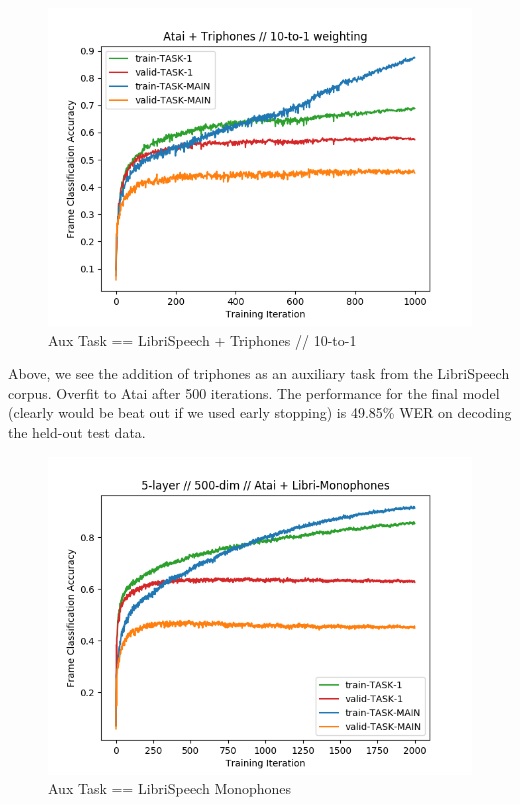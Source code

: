 \documentclass[a4paper]{article}
\begin{document}
\begin{figure}[!htb]
  \centering
{}
  \includegraphics[width=\linewidth]{figs/atai-libritriphones-10-to-1.png}
  \caption{Aux Task == LibriSpeech + Triphones // 10-to-1}
\endminipage\hfill
\end{figure}



Above, we see the addition of triphones as an auxiliary task from the LibriSpeech corpus. Overfit to Atai after 500 iterations. The performance for the final model (clearly would be beat out if we used early stopping) is 49.85\% WER on decoding the held-out test data.

\begin{figure}[!htb]
  \centering
{}
  \includegraphics[width=\linewidth]{figs/atai-librimonophones.png}
  \caption{Aux Task == LibriSpeech Monophones}
\endminipage\hfill
\end{figure}
\end{document}
